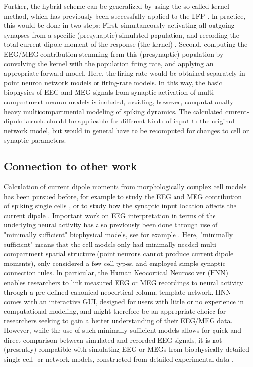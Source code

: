 \documentclass[preprint,10pt,authoryear]{elsarticle}
\begin{document}
Further, the hybrid scheme can be generalized by using the so-called kernel method, which has previously been successfully applied to the LFP \citep{HAGEN2016, Skaar2020, Telenczuk2020}. In practice, this would be done in two steps: First, simultaneously activating all outgoing synapses from a specific (presynaptic) simulated population, and recording the total current dipole moment of the response (the kernel) \citep{HAGEN2016}. Second, computing the EEG/MEG contribution stemming from this (presynaptic) population by convolving the kernel with the population firing   
rate, and applying an appropriate forward model. Here, the firing rate would be obtained separately in point neuron network models or firing-rate models. In this way, the basic biophysics of EEG and MEG signals from
synaptic activation of multi-compartment neuron models is included, avoiding, however, computationally heavy multicompartmental modeling of spiking dynamics.  
The calculated current-dipole kernels should be applicable for different kinds of input to the original network model, but would in general have to be recomputed for changes to cell or synaptic parameters. 

\subsection{Connection to other work}
Calculation of current dipole moments from morphologically complex cell models has been pursued before, for example to study the EEG and MEG contribution of spiking single cells \citep{Murakami2006}, or to study how the synaptic input location affects the current dipole \citep{LINDEN2010, AHLFORS2015}.
Important work on EEG interpretation in terms of the underlying neural activity has also previously been done through use of "minimally sufficient" biophysical models, see for example \cite{Murakami2002, Murakami2003, Jones2007, Jones2009, Sliva2018, NEYMOTIN2020}. 
Here, "minimally sufficient" means that the cell models only had minimally needed multi-compartment spatial structure (point neurons cannot produce current dipole moments), only considered a few cell types, and employed simple synaptic connection rules.
In particular, the Human Neocortical Neurosolver (HNN) \citep{NEYMOTIN2020} enables researchers to link measured EEG or MEG recordings to neural activity through a pre-defined canonical neocortical column template network. 
HNN comes with an interactive GUI, designed for users with little or no experience in computational modeling, and might therefore be an appropriate choice for researchers seeking to gain a better understanding of their EEG/MEG data.  
However, while the use of such minimally sufficient models allows for quick and direct comparison between simulated and recorded EEG signals, it is not (presently) compatible with simulating EEG or MEGs from biophysically detailed single cell- or network models, constructed from detailed experimental data \citep{Reimann2013, Egger2014, MARKRAM2015, HAGEN2016, Gratiy2018, Arkhipov2018, BILLEH2019}.  
\end{document}
